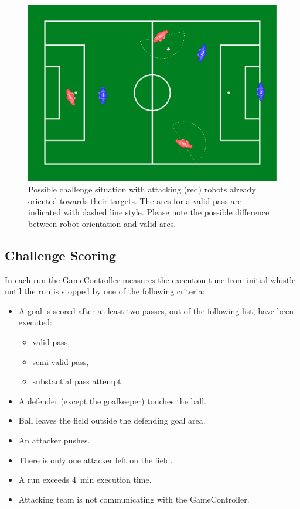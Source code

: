 \begin{figure}[ht!]
	\begin{center}
		\leavevmode
		\includegraphics[width=1\columnwidth]{figs/dbhc_arcs.pdf}
		\caption{Possible challenge situation with {\color{red} attacking (red)} robots already oriented towards their targets. The arcs for a valid pass are indicated with dashed line style. Please note the possible difference between robot orientation and valid arcs.}
		\label{fig:ball_handling_arc_positions}
	\end{center}
\end{figure}

\subsection{Challenge Scoring}
\label{sec:Challenge_scoring}
In each run the GameController measures the execution time from initial whistle until the run is stopped by one of the following criteria:

\begin{itemize}
	\item A goal is scored after at least two passes, out of the following list, have been executed:
	\begin{itemize}
		\item valid pass,
		\item semi-valid pass,
		\item substantial pass attempt.
	\end{itemize}
	\item A defender (except the goalkeeper) touches the ball.
	\item Ball leaves the field outside the defending goal area.
	\item An attacker pushes.
	\item There is only one attacker left on the field.
	\item A run exceeds \qty{4}{\minute} execution time.
	\item Attacking team is not communicating with the GameController.
\end{itemize}

